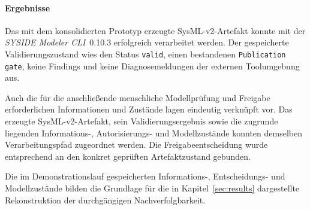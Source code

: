 \paragraph{Ergebnisse}

Das mit dem konsolidierten Prototyp erzeugte SysML-v2-Artefakt konnte mit
der \emph{SYSIDE Modeler CLI}~0.10.3 erfolgreich verarbeitet werden. Der
gespeicherte Validierungszustand wies den Status \texttt{valid}, einen
bestandenen \texttt{Publication gate}, keine Findings und keine
Diagnosemeldungen der externen Toolumgebung aus.

Auch die für die anschließende menschliche Modellprüfung und Freigabe
erforderlichen Informationen und Zustände lagen eindeutig verknüpft vor.
Das erzeugte SysML-v2-Artefakt, sein Validierungsergebnis sowie die zugrunde
liegenden Informations-, Autorisierungs- und Modellzustände konnten
demselben Verarbeitungspfad zugeordnet werden. Die Freigabeentscheidung
wurde entsprechend an den konkret geprüften Artefaktzustand gebunden.

Die im Demonstrationslauf gespeicherten Informations-, Entscheidungs- und
Modellzustände bilden die Grundlage für die in
Kapitel~\ref{sec:results} dargestellte Rekonstruktion der durchgängigen
Nachverfolgbarkeit.